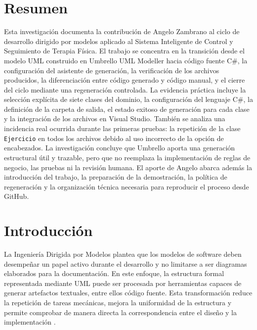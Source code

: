 



\tableofcontents
\clearpage
{}

\section{Resumen}
Esta investigación documenta la contribución de Angelo Zambrano al ciclo de desarrollo dirigido por modelos aplicado al Sistema Inteligente de Control y Seguimiento de Terapia Física. El trabajo se concentra en la transición desde el modelo UML construido en Umbrello UML Modeller hacia código fuente C\#, la configuración del asistente de generación, la verificación de los archivos producidos, la diferenciación entre código generado y código manual, y el cierre del ciclo mediante una regeneración controlada. La evidencia práctica incluye la selección explícita de siete clases del dominio, la configuración del lenguaje C\#, la definición de la carpeta de salida, el estado exitoso de generación para cada clase y la integración de los archivos en Visual Studio. También se analiza una incidencia real ocurrida durante las primeras pruebas: la repetición de la clase \texttt{Ejercicio} en todos los archivos debido al uso incorrecto de la opción de encabezados. La investigación concluye que Umbrello aporta una generación estructural útil y trazable, pero que no reemplaza la implementación de reglas de negocio, las pruebas ni la revisión humana. El aporte de Angelo abarca además la introducción del trabajo, la preparación de la demostración, la política de regeneración y la organización técnica necesaria para reproducir el proceso desde GitHub.

\section{Introducción}
La Ingeniería Dirigida por Modelos plantea que los modelos de software deben desempeñar un papel activo durante el desarrollo y no limitarse a ser diagramas elaborados para la documentación. En este enfoque, la estructura formal representada mediante UML puede ser procesada por herramientas capaces de generar artefactos textuales, entre ellos código fuente. Esta transformación reduce la repetición de tareas mecánicas, mejora la uniformidad de la estructura y permite comprobar de manera directa la correspondencia entre el diseño y la implementación \cite{Schmidt2006,Selic2003,Brambilla2017}.

